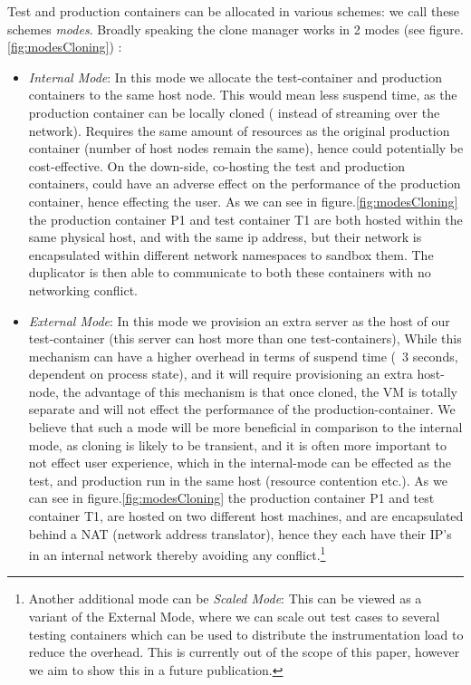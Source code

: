 Test and production containers can be allocated in various schemes: we call these schemes \textit{modes}. 
Broadly speaking the clone manager works in 2 modes (see figure.\ref{fig:modesCloning}) : 
\begin{itemize}

\item \textit{Internal Mode}: In this mode we allocate the test-container and  production containers to the same host node. 
This would mean less suspend time, as the production container can be locally cloned ( instead of streaming over the network). 
Requires the same amount of resources as the original production container (number of host nodes remain the same), hence could potentially be cost-effective.
On the down-side, co-hosting the test and production containers, could have an adverse effect on the performance of the production container, hence effecting the user.
As we can see in figure.\ref{fig:modesCloning} the production container P1 and test container T1 are both hosted within the same physical host, and with the same ip address, but their network is encapsulated within different network namespaces to sandbox them.
The duplicator is then able to communicate to both these containers with no networking conflict.

\item \textit{External Mode}: In this mode we provision an extra server as the host of our test-container (this server can host more than one test-containers), 
While this mechanism can have a higher overhead in terms of suspend time (~3 seconds, dependent on process state), and it will require provisioning an extra host-node, the advantage of this mechanism is that once cloned, the VM is totally separate and will not effect the performance of the production-container.
We believe that such a mode will be more beneficial in comparison to the internal mode, as cloning is likely to be transient, and it is often more important to not effect user experience, which in the internal-mode can be effected as the test, and production run in the same host (resource contention etc.).
As we can see in figure.\ref{fig:modesCloning} the production container P1 and test container T1, are hosted on two different host machines, and are encapsulated behind a NAT\cite{nat} (network address translator), hence they each have their IP's in an internal network thereby avoiding any conflict.\footnote{ Another additional mode can be \textit{Scaled Mode}: This can be viewed as a variant of the External Mode, where we can scale out test cases to several testing containers which can be used to distribute the instrumentation load to reduce the overhead. This is currently out of the scope of this paper, however we aim to show this in a future publication.}

\end{itemize}

